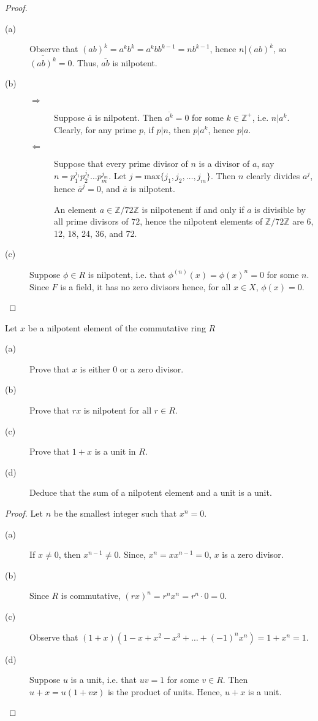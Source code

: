 \documentclass[12pt,leqno]{book}
\numberwithin{equation}{section}
\newcommand{\question}[2] {\vspace{.25in}\noindent\fbox{#1} #2 \vspace{.10in}}
\theoremstyle{definition}
\begin{document}
\begin{proof}\indent
 \begin{description}
  \item [(a)] Observe that $(ab)^k=a^kb^k=a^kbb^{k-1}=nb^{k-1}$, hence $n|(ab)^k$, so $\overline{(ab)^k}=0$. Thus, $\overline{ab}$ is nilpotent.
  \item [(b)] \begin{description}
               \item [$\Rightarrow$] Suppose $\overline{a}$ is nilpotent. Then $\overline{a^k}=0$ for some $k\in\mathbb{Z}^+$, i.e. $n|a^k$. Clearly, for any prime $p$, if $p|n$, then $p|a^k$, hence $p|a$.
	       \item [$\Leftarrow$] Suppose that every prime divisor of $n$ is a divisor of $a$, say $n=p_1^{j_1}p_2^{j_2}\hdots p_m^{j_m}$. Let $j=\text{max}\{j_1,j_2,\hdots,j_m\}$. Then $n$ clearly divides $a^j$, hence $\overline{a}^j=0$, and $\overline{a}$ is nilpotent.

An element $a\in\mathbb{Z}/72\mathbb{Z}$ is nilpotenent if and only if $a$ is divisible by all prime divisors of $72$, hence the nilpotent elements of $\mathbb{Z}/72\mathbb{Z}$ are 6, 12, 18, 24, 36, and 72.
              \end{description}
  \item [(c)] Suppose $\phi\in R$ is nilpotent, i.e. that $\phi^{(n)}(x)=\phi(x)^n=0$ for some $n$. Since $F$ is a field, it has no zero divisors hence, for all $x\in X$, $\phi(x)=0$.\qedhere
 \end{description}

\end{proof}

\question{14}{Let $x$ be a nilpotent element of the commutative ring $R$}
\begin{description}
 \item [(a)] Prove that $x$ is either 0 or a zero divisor.
 \item [(b)] Prove that $rx$ is nilpotent for all $r\in R$.
 \item [(c)] Prove that $1+x$ is a unit in $R$.
 \item [(d)] Deduce that the sum of a nilpotent element and a unit is a unit.
\end{description}

\begin{proof}
Let $n$ be the smallest integer such that $x^n=0$.
 \begin{description}
  \item [(a)] If $x\not=0$, then $x^{n-1}\not=0$. Since, $x^n=xx^{n-1}=0$, $x$ is a zero divisor.
  \item [(b)] Since $R$ is commutative, $(rx)^n=r^nx^n=r^n\cdot0=0$.
  \item [(c)] Observe that $(1+x)(1-x+x^2-x^3+\hdots+(-1)^nx^n)=1+x^n=1$.
  \item [(d)] Suppose $u$ is a unit, i.e. that $uv=1$ for some $v\in R$. Then $u+x=u(1+vx)$ is the product of units. Hence, $u+x$ is a unit.\qedhere
\end{description}
\end{proof}
\end{document}
